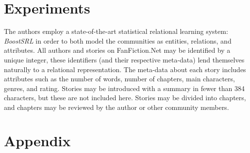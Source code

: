\documentclass[letterpaper]{article}
\begin{document}
\section{Experiments}

The authors employ a state-of-the-art statistical relational learning system: \textit{BoostSRL} in order to both model the communities as entities, relations, and attributes. All authors and stories on FanFiction.Net may be identified by a unique integer, these identifiers (and their respective meta-data) lend themselves naturally to a relational representation. The meta-data about each story includes attributes such as the number of words, number of chapters, main characters, genres, and rating. Stories may be introduced with a summary in fewer than 384 characters, but these are not included here. Stories may be divided into chapters, and chapters may be reviewed by the author or other community members.

\section{Appendix}





\end{document}
